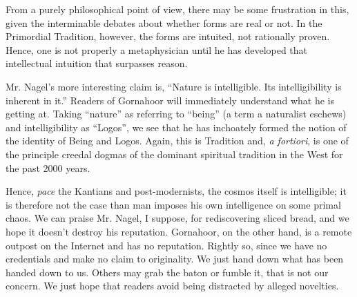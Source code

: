 From a purely philosophical point of view, there may be some frustration in this, given the interminable debates about whether forms are real or not. In the Primordial Tradition, however, the forms are intuited, not rationally proven. Hence, one is not properly a metaphysician until he has developed that intellectual intuition that surpasses reason.

Mr. Nagel's more interesting claim is, ``Nature is intelligible. Its intelligibility is inherent in it.'' Readers of Gornahoor will immediately understand what he is getting at. Taking ``nature'' as referring to ``being'' (a term a naturalist eschews) and intelligibility as ``Logos'', we see that he has inchoately formed the notion of the identity of Being and Logos. Again, this is Tradition and, \emph{a fortiori}, is one of the principle creedal dogmas of the dominant spiritual tradition in the West for the past 2000 years.

Hence, \emph{pace} the Kantians and post-modernists, the cosmos itself is intelligible; it is therefore not the case than man imposes his own intelligence on some primal chaos. We can praise Mr. Nagel, I suppose, for rediscovering sliced bread, and we hope it doesn't destroy his reputation. Gornahoor, on the other hand, is a remote outpost on the Internet and has no reputation. Rightly so, since we have no credentials and make no claim to originality. We just hand down what has been handed down to us. Others may grab the baton or fumble it, that is not our concern. We just hope that readers avoid being distracted by alleged novelties.



